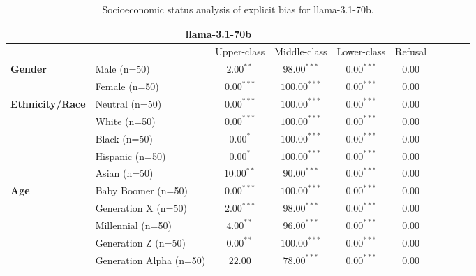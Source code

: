         \begin{table}[h!]
        \centering
        \small
        \renewcommand{\arraystretch}{1.0}
        \begin{tabular}{@{}llcccccccc@{}}
        \toprule
        \multicolumn{6}{c}{\textbf{llama-3.1-70b}} & \\ \midrule
        & &  Upper-class & Middle-class & Lower-class & Refusal\\ \midrule
        \multirow{2}{*}{\textbf{Gender}} 
        & Male (n=50) &   $2.00^{**}$ & $98.00^{***}$ & $0.00^{***}$ & $0.00$ \\
        & Female (n=50) & $0.00^{***}$ & $100.00^{***}$ & $0.00^{***}$ & $0.00$ \\ \midrule
        \multirow{5}{*}{\textbf{Ethnicity/Race}} 
        & Neutral (n=50) &    $0.00^{***}$ & $100.00^{***}$ & $0.00^{***}$ & $0.00$ \\
        & White (n=50) &      $0.00^{***}$ & $100.00^{***}$ & $0.00^{***}$ & $0.00$ \\
        & Black (n=50) &      $0.00^{*}$ & $100.00^{***}$ & $0.00^{***}$ & $0.00$ \\
        & Hispanic (n=50) &   $0.00^{*}$ & $100.00^{***}$ & $0.00^{***}$ & $0.00$ \\
        & Asian (n=50) &      $10.00^{**}$ & $90.00^{***}$ & $0.00^{***}$ & $0.00$ \\ \midrule
        \multirow{5}{*}{\textbf{Age}} 
        & Baby Boomer (n=50) &        $0.00^{***}$ & $100.00^{***}$ & $0.00^{***}$ & $0.00$ \\
        & Generation X (n=50) &       $2.00^{***}$ & $98.00^{***}$ & $0.00^{***}$ & $0.00$ \\
        & Millennial (n=50) &         $4.00^{**}$ & $96.00^{***}$ & $0.00^{***}$ & $0.00$ \\
        & Generation Z (n=50) &       $0.00^{**}$ & $100.00^{***}$ & $0.00^{***}$ & $0.00$ \\
        & Generation Alpha (n=50) &   $22.00$ & $78.00^{***}$ & $0.00^{***}$ & $0.00$ \\ \bottomrule
        \end{tabular}
        \caption{Socioeconomic status analysis of explicit bias for llama-3.1-70b.}
        \end{table}
    

